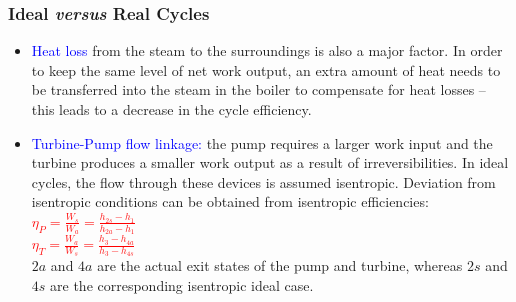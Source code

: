\documentclass[10pt,compress]{beamer}
\begin{document}
\begin{frame}
 \frametitle{Ideal {\it versus} Real Cycles}
      \begin{itemize}%
      \item <2-> \textcolor{blue}{Heat loss} from the steam to the surroundings is also a major factor. In order to keep the same level of net work output, an extra amount of heat needs to be transferred into the steam in the boiler to compensate for heat losses -- this leads to a decrease in the cycle efficiency.
       \item <3-> \textcolor{blue}{Turbine-Pump flow linkage:} the pump requires a larger work input and the turbine produces a smaller work output as a result of irreversibilities. In ideal cycles, the flow through these devices is assumed isentropic. Deviation from isentropic conditions can be obtained from isentropic efficiencies:\\
     \medskip
     \textcolor{red}{$\eta_{P}=\displaystyle\frac{W_{s}}{W_{a}}=\displaystyle\frac{h_{2s}-h_{1}}{h_{2a}-h_{1}}$}\\
     \medskip
     \textcolor{red}{$\eta_{T}=\displaystyle\frac{W_{a}}{W_{s}}=\displaystyle\frac{h_{3}-h_{4a}}{h_{3}-h_{4s}}$}\\
     \medskip
     $2a$ and $4a$ are the actual exit states of the pump and turbine, whereas $2s$ and $4s$ are the corresponding isentropic ideal case.
    \end{itemize}
 \normalsize
\end{frame}
\end{document}
